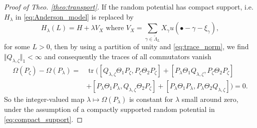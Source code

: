 \documentclass[reqno,12pt,letterpaper]{amsart}
\numberwithin{equation}{section}
\DeclareMathOperator{\tr}{tr}
\begin{document}
\begin{proof}[Proof of Theo. \ref{theo:transport}]
If the random potential has compact support, i.e. $H_{\lambda}$ in \eqref{eq:Anderson_model} is replaced by
\begin{equation}
\label{eq:compact_support}
H_{\lambda}(L) = H + \lambda V_X \text{ where } V_X = \sum_{\gamma \in \tilde \Lambda_L}X_{\gamma} u(\bullet-\gamma-\xi_{\gamma}),
\end{equation}
for some $L>0$, then by using a partition of unity and \eqref{eq:trace_norm}, we find $\Vert Q_{\lambda,\zeta} \Vert_1<\infty$ and consequently the traces of all commutators vanish
\begin{equation}
\label{eq:small_l}
\begin{split} \Omega(P_{\zeta})-\Omega(P_{\lambda}) =& \tr([Q_{\lambda,\zeta}\Theta_1 P_{\zeta}, P_{\zeta} \Theta_2 P_{\zeta}]+[ P_{\lambda}\Theta_1Q_{\lambda,\zeta}, P_{\zeta} \Theta_2 P_{\zeta}] \\
&+[ P_{\lambda}\Theta_1P_{\lambda},Q_{\lambda,\zeta} \Theta_2 P_{\zeta}]+[ P_{\lambda}\Theta_1P_{\lambda},P_{\lambda} \Theta_2Q_{\lambda,\zeta} ])=0.
\end{split}
\end{equation}
So the integer-valued map $\lambda \mapsto \Omega(P_{\lambda}) $ is constant for $\lambda$ small around zero, under the assumption of a compactly supported random potential in \eqref{eq:compact_support}.


\end{proof}
\end{document}
